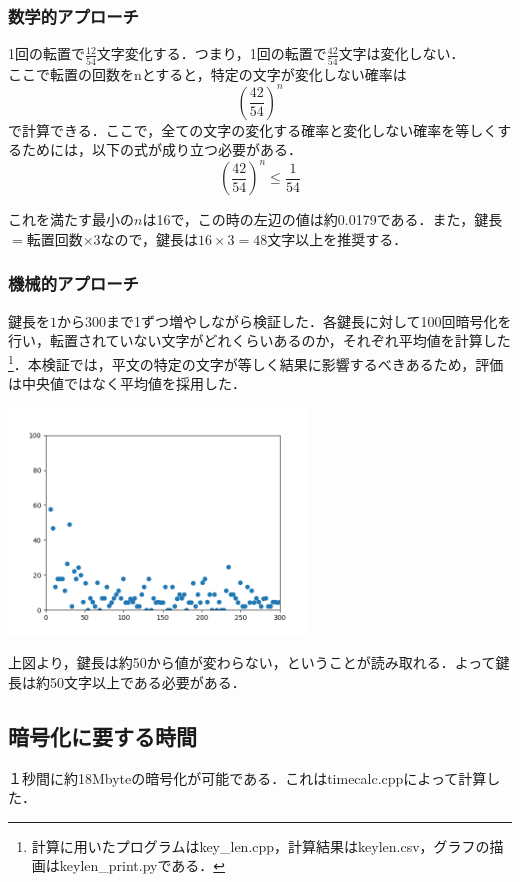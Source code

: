 \documentclass[a4p]{jarticle}
\begin{document}
\subsubsection{数学的アプローチ}
1回の転置で\(\frac{12}{54}\)文字変化する．つまり，1回の転置で\(\frac{42}{54}\)文字は変化しない．\\
ここで転置の回数をnとすると，特定の文字が変化しない確率は
\[\left(\frac{42}{54}\right)^n\]
で計算できる．ここで，全ての文字の変化する確率と変化しない確率を等しくするためには，以下の式が成り立つ必要がある．
\[\left(\frac{42}{54}\right)^n \leq \frac{1}{54}\]

これを満たす最小の\(n\)は16で，この時の左辺の値は約0.0179である．また，鍵長\(=\)転置回数\(\times 3\)なので，鍵長は\(16\times3=48\)文字以上を推奨する．

\subsubsection{機械的アプローチ}

鍵長を\(1\)から\(300\)まで1ずつ増やしながら検証した．各鍵長に対して100回暗号化を行い，転置されていない文字がどれくらいあるのか，それぞれ平均値を計算した\footnote{計算に用いたプログラムはkey\_len.cpp，計算結果はkeylen.csv，グラフの描画はkeylen\_print.pyである．}．本検証では，平文の特定の文字が等しく結果に影響するべきあるため，評価は中央値ではなく平均値を採用した．\\
\begin{center}
  \includegraphics[width=8cm]{./tex_pic/figure.png}\\
\end{center}
上図より，鍵長は約50から値が変わらない，ということが読み取れる．よって鍵長は約50文字以上である必要がある．

\subsection{暗号化に要する時間}
１秒間に約18Mbyteの暗号化が可能である．これはtimecalc.cppによって計算した．
\end{document}

